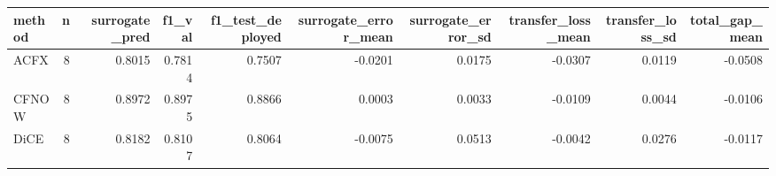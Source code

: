 \begin{tabular}{lrrrrrrrrr}
\toprule
method &  n &  surrogate\_pred &  f1\_val &  f1\_test\_deployed &  surrogate\_error\_mean &  surrogate\_error\_sd &  transfer\_loss\_mean &  transfer\_loss\_sd &  total\_gap\_mean \\
\midrule
  ACFX &  8 &          0.8015 &  0.7814 &            0.7507 &               -0.0201 &              0.0175 &             -0.0307 &            0.0119 &         -0.0508 \\
 CFNOW &  8 &          0.8972 &  0.8975 &            0.8866 &                0.0003 &              0.0033 &             -0.0109 &            0.0044 &         -0.0106 \\
  DiCE &  8 &          0.8182 &  0.8107 &            0.8064 &               -0.0075 &              0.0513 &             -0.0042 &            0.0276 &         -0.0117 \\
\bottomrule
\end{tabular}
